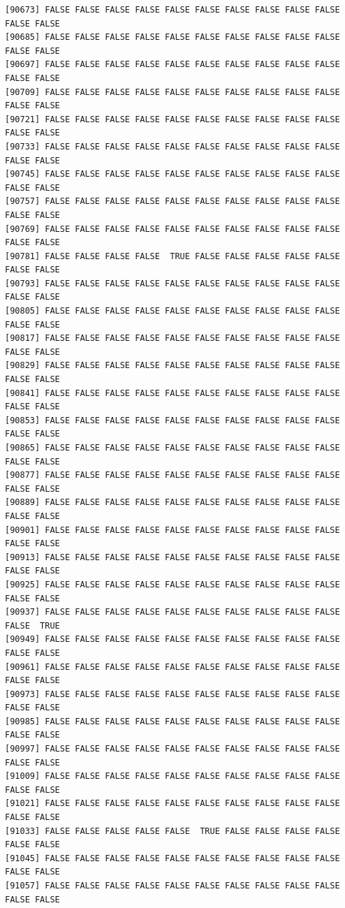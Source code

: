 \documentclass[
  a4paper,
  DIV=11,
  numbers=noendperiod]{scrartcl}
\begin{document}
\begin{verbatim}
[90673] FALSE FALSE FALSE FALSE FALSE FALSE FALSE FALSE FALSE FALSE FALSE FALSE
[90685] FALSE FALSE FALSE FALSE FALSE FALSE FALSE FALSE FALSE FALSE FALSE FALSE
[90697] FALSE FALSE FALSE FALSE FALSE FALSE FALSE FALSE FALSE FALSE FALSE FALSE
[90709] FALSE FALSE FALSE FALSE FALSE FALSE FALSE FALSE FALSE FALSE FALSE FALSE
[90721] FALSE FALSE FALSE FALSE FALSE FALSE FALSE FALSE FALSE FALSE FALSE FALSE
[90733] FALSE FALSE FALSE FALSE FALSE FALSE FALSE FALSE FALSE FALSE FALSE FALSE
[90745] FALSE FALSE FALSE FALSE FALSE FALSE FALSE FALSE FALSE FALSE FALSE FALSE
[90757] FALSE FALSE FALSE FALSE FALSE FALSE FALSE FALSE FALSE FALSE FALSE FALSE
[90769] FALSE FALSE FALSE FALSE FALSE FALSE FALSE FALSE FALSE FALSE FALSE FALSE
[90781] FALSE FALSE FALSE FALSE  TRUE FALSE FALSE FALSE FALSE FALSE FALSE FALSE
[90793] FALSE FALSE FALSE FALSE FALSE FALSE FALSE FALSE FALSE FALSE FALSE FALSE
[90805] FALSE FALSE FALSE FALSE FALSE FALSE FALSE FALSE FALSE FALSE FALSE FALSE
[90817] FALSE FALSE FALSE FALSE FALSE FALSE FALSE FALSE FALSE FALSE FALSE FALSE
[90829] FALSE FALSE FALSE FALSE FALSE FALSE FALSE FALSE FALSE FALSE FALSE FALSE
[90841] FALSE FALSE FALSE FALSE FALSE FALSE FALSE FALSE FALSE FALSE FALSE FALSE
[90853] FALSE FALSE FALSE FALSE FALSE FALSE FALSE FALSE FALSE FALSE FALSE FALSE
[90865] FALSE FALSE FALSE FALSE FALSE FALSE FALSE FALSE FALSE FALSE FALSE FALSE
[90877] FALSE FALSE FALSE FALSE FALSE FALSE FALSE FALSE FALSE FALSE FALSE FALSE
[90889] FALSE FALSE FALSE FALSE FALSE FALSE FALSE FALSE FALSE FALSE FALSE FALSE
[90901] FALSE FALSE FALSE FALSE FALSE FALSE FALSE FALSE FALSE FALSE FALSE FALSE
[90913] FALSE FALSE FALSE FALSE FALSE FALSE FALSE FALSE FALSE FALSE FALSE FALSE
[90925] FALSE FALSE FALSE FALSE FALSE FALSE FALSE FALSE FALSE FALSE FALSE FALSE
[90937] FALSE FALSE FALSE FALSE FALSE FALSE FALSE FALSE FALSE FALSE FALSE  TRUE
[90949] FALSE FALSE FALSE FALSE FALSE FALSE FALSE FALSE FALSE FALSE FALSE FALSE
[90961] FALSE FALSE FALSE FALSE FALSE FALSE FALSE FALSE FALSE FALSE FALSE FALSE
[90973] FALSE FALSE FALSE FALSE FALSE FALSE FALSE FALSE FALSE FALSE FALSE FALSE
[90985] FALSE FALSE FALSE FALSE FALSE FALSE FALSE FALSE FALSE FALSE FALSE FALSE
[90997] FALSE FALSE FALSE FALSE FALSE FALSE FALSE FALSE FALSE FALSE FALSE FALSE
[91009] FALSE FALSE FALSE FALSE FALSE FALSE FALSE FALSE FALSE FALSE FALSE FALSE
[91021] FALSE FALSE FALSE FALSE FALSE FALSE FALSE FALSE FALSE FALSE FALSE FALSE
[91033] FALSE FALSE FALSE FALSE FALSE  TRUE FALSE FALSE FALSE FALSE FALSE FALSE
[91045] FALSE FALSE FALSE FALSE FALSE FALSE FALSE FALSE FALSE FALSE FALSE FALSE
[91057] FALSE FALSE FALSE FALSE FALSE FALSE FALSE FALSE FALSE FALSE FALSE FALSE

\end{verbatim}
\end{document}
